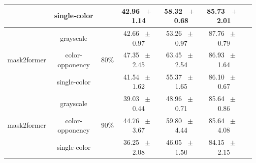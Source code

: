 \begin{table}[h]
\begin{tabular}{@{}lccc ccc@{}}
    & single-color & & 42.96 ~$\pm$~ 1.14 & 58.32 ~$\pm$~ 0.68 & 85.73 ~$\pm$~ 2.01 \\
    \midrule
    \multirow{3}{*}{mask2former} & grayscale & \multirow{3}{*}{80\%} & 42.66 ~$\pm$~ 0.97 & 53.26 ~$\pm$~ 0.97 & 87.76 ~$\pm$~ 0.79 \\
    & color-opponency & & 47.35 ~$\pm$~ 2.45 & 63.45 ~$\pm$~ 2.54 & 86.93 ~$\pm$~ 1.64 \\
    & single-color & & 41.54 ~$\pm$~ 1.62 & 55.37 ~$\pm$~ 1.65 & 86.10 ~$\pm$~ 0.67 \\
    \midrule
    \multirow{3}{*}{mask2former} & grayscale & \multirow{3}{*}{90\%} & 39.03 ~$\pm$~ 0.44 & 48.96 ~$\pm$~ 0.71 & 85.64 ~$\pm$~ 0.86 \\
    & color-opponency & & 44.76 ~$\pm$~ 3.67 & 59.80 ~$\pm$~ 4.44 & 85.64 ~$\pm$~ 4.08 \\
    & single-color & & 36.25 ~$\pm$~ 2.08 & 46.05 ~$\pm$~ 1.50 & 84.15 ~$\pm$~ 2.15 \\
    \midrule
    \bottomrule
  \end{tabular}
  \label{tab:sparse_mask2former_acdc_rain}
\end{table}